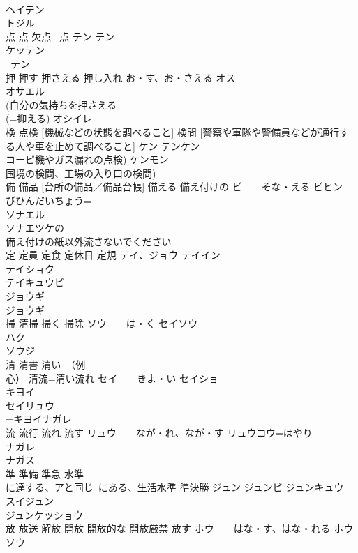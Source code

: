 \documentclass[8pt]{extreport}
\begin{document}
\begin{CJK}{UTF8}{min}
\\	ヘイテン 
\\	トジル 
\\	点 点 欠点 ~点	テン テン 
\\	ケッテン 
\\	~テン 
\\	押 押す 押さえる 押し入れ	お・す、お・さえる オス 
\\	オサエル 
\\	(自分の気持ちを押さえる 
\\	(=抑える) オシイレ 
\\	検 点検 [機械などの状態を調べること] 検問 [警察や軍隊や警備員などが通行する人や車を止めて調べること]	ケン テンケン 
\\	コーピ機やガス漏れの点検) ケンモン 
\\	国境の検問、工場の入り口の検問)
\\	備 備品 [台所の備品／備品台帳] 備える 備え付けの	ビ　　そな・える ビヒン 
\\	びひんだいちょう=
\\	ソナエル 
\\	ソナエツケの 
\\	備え付けの紙以外流さないでください
\\	定 定員 定食 定休日 定規	テイ、ジョウ テイイン　
\\	テイショク 
\\	テイキュウビ 
\\	ジョウギ 
\\	ジョウギ
\\	掃 清掃 掃く 掃除	ソウ　　は・く セイソウ　
\\	ハク 
\\	ソウジ 
\\	清 清書 清い　（例
\\	心） 清流=清い流れ	セイ　　きよ・い セイショ 
\\	キヨイ 
\\	セイリュウ 
\\	=キヨイナガレ
\\	流 流行 流れ 流す	リュウ　　なが・れ、なが・す リュウコウ=はやり 
\\	ナガレ 
\\	ナガス 
\\	準 準備 準急 水準 
\\	に達する、アと同じ~にある、生活水準 準決勝	ジュン ジュンビ ジュンキュウ 
\\	スイジュン 
\\	ジュンケッショウ 
\\	放 放送 解放 開放 開放的な 開放厳禁 放す	ホウ　　はな・す、はな・れる ホウソウ 

\end{CJK}
\end{document}
